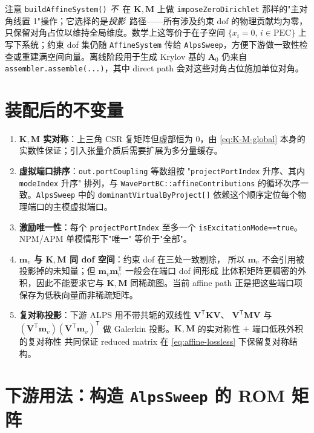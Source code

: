 \documentclass[UTF8,a4paper,11pt]{ctexart}
\newcommand{\transpose}{\mathsf{T}}
\newcommand{\code}[1]{\texttt{\small #1}}
\begin{document}
注意 \code{buildAffineSystem()} \emph{不}\ 在 $\bm K,\bm M$ 上做 \code{imposeZeroDirichlet}
那样的"主对角线置 1"操作；它选择的是\emph{投影}\ 路径——所有涉及约束 dof 的物理贡献均为零，
只保留对角占位以维持全局维度。数学上这等价于在子空间
$\{x_i=0,\,i\in\text{PEC}\}$ 上写下系统；约束 dof 集仍随 \code{AffineSystem}
传给 \code{AlpsSweep}，方便下游做一致性检查或重建满空间向量。离线阶段用于生成 Krylov 基的
$\bm A_0$ 仍来自 \code{assembler.assemble(...)}，其中 direct path 会对这些对角占位施加单位对角。

\section{装配后的不变量}
\label{sec:invariants}

\begin{enumerate}[leftmargin=2em]
\item \textbf{$\bm K,\bm M$ 实对称}：上三角 CSR 复矩阵但虚部恒为 0，由 \eqref{eq:K-M-global}
本身的实数性保证；引入张量介质后需要扩展为多分量缓存。
\item \textbf{虚拟端口排序}：\code{out.portCoupling} 等数组按
"\code{projectPortIndex} 升序、其内 \code{modeIndex} 升序" 排列，与
\code{WavePortBC::affineContributions} 的循环次序一致。\code{AlpsSweep} 中的
\code{dominantVirtualByProject[]} 依赖这个顺序定位每个物理端口的主模虚拟端口。
\item \textbf{激励唯一性}：每个 \code{projectPortIndex} 至多一个 \code{isExcitationMode==true}。
NPM/APM 单模情形下"唯一" 等价于"全部"。
\item \textbf{$\bm m_v$ 与 $\bm K,\bm M$ 同 dof 空间}：约束 dof 在三处一致剔除，
所以 $\bm m_v$ 不会引用被投影掉的未知量；但 $\bm m_v\bm m_v^{\transpose}$ 一般会在端口 dof 间形成
比体积矩阵更稠密的外积，因此不能要求它与 $\bm K,\bm M$ 同稀疏图。当前 affine path 正是把这些端口项保存为低秩向量而非稀疏矩阵。
\item \textbf{复对称投影}：下游 ALPS 用不带共轭的双线性 $\bm V^{\transpose}\bm K\bm V$、
$\bm V^{\transpose}\bm M\bm V$ 与 $(\bm V^{\transpose}\bm m_v)(\bm V^{\transpose}\bm m_v)^{\transpose}$ 做
Galerkin 投影。$\bm K,\bm M$ 的实对称性 $+$ 端口低秩外积的复对称性
共同保证 reduced matrix 在 \eqref{eq:affine-lossless} 下保留复对称结构。
\end{enumerate}

\section{\texorpdfstring{下游用法：构造 \code{AlpsSweep} 的 ROM 矩阵}{下游用法：构造 AlpsSweep 的 ROM 矩阵}}
\label{sec:alps-downstream}
\end{document}
